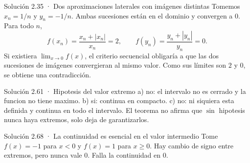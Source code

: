 \documentclass[10pt,a4paper,oneside,openany]{book}
\begin{document}
\begin{PSevenSolutionFixed}{Solución 2.35 · Dos aproximaciones laterales con imágenes distintas}
Tomemos \(x_n=1/n\) y \(y_n=-1/n\). Ambas sucesiones están en el dominio y convergen a \(0\). Para todo \(n\),
\[
f(x_n)=\frac{x_n+|x_n|}{x_n}=2,
\qquad
f(y_n)=\frac{y_n+|y_n|}{y_n}=0.
\]
Si existiera \(\lim_{x\to0}f(x)\), el criterio secuencial obligaría a que las dos sucesiones de imágenes convergieran al mismo valor. Como sus límites son \(2\) y \(0\), se obtiene una contradicción.
\end{PSevenSolutionFixed}
\begin{PSevenSolutionFixed}{Solución 2.61 · Hipotesis del valor extremo}
a) no: el intervalo no es cerrado y la funcion no tiene maximo. b) si: continua en compacto. c) no: ni siquiera esta definida y continua en todo el intervalo. El teorema no afirma que \(\sin\) hipotesis nunca haya extremos, solo deja de garantizarlos.
\end{PSevenSolutionFixed}
\begin{PSevenSolutionFixed}{Solución 2.68 · La continuidad es esencial en el valor intermedio}
Tome \(f(x)=-1\) para \(x<0\) y \(f(x)=1\) para \(x\ge 0\). Hay cambio de signo entre extremos, pero nunca vale \(0\). Falla la continuidad en \(0\).
\end{PSevenSolutionFixed}
\end{document}
